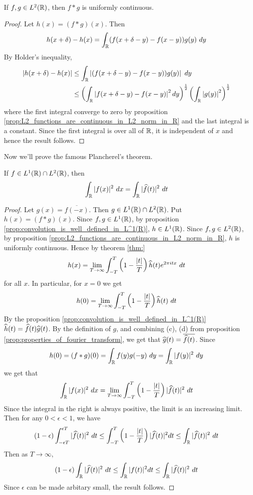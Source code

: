   \begin{proposition}
    If $f, g \in L^2(\mathbb R)$, then $f*g$ is uniformly continuous.
  \end{proposition}
  \begin{proof}
    Let $h(x) = (f*g)(x)$. Then $$h(x+\delta) - h(x) = \int_\mathbb R (f(x+\delta - y) - f(x-y)) g(y) \ dy$$
    By Holder's inequality, 
    \begin{align*}
      |h(x+\delta) - h(x)| &\le \int_\mathbb R \left|(f(x+\delta - y) - f(x-y)) g(y) \right| \ dy \\
      &\le \left( \int_\mathbb R \left|f(x+\delta - y) - f(x-y) \right|^2 dy\right)^{\frac{1}{2}} \left( \int_\mathbb R \left|g(y)\right|^2 \right)^{\frac{1}{2}}
    \end{align*}
    where the first integral converge to zero by proposition \ref{prop:L2_functions_are_continuous_in_L2_norm_in_R} and the last integral is a constant. Since the first integral is over all of $\mathbb R$, it is independent of $x$ and hence the result follows.
  \end{proof}

Now we'll prove the famous Plancherel's theorem.
\begin{theorem}
  \label{thm:Plancherel's_theorem}
  If $f \in L^1(\mathbb R) \cap L^2(\mathbb R)$, then $$\int_\R |f(x)|^2 \ dx = \int_\R |\hatf(t)|^2 \ dt $$
\end{theorem}
\begin{proof}
  Let $g(x) = \overline{f(-x)}$. Then $g \in L^1(\mathbb R)\cap L^2(\mathbb R)$. Put $h(x) = (f*g)(x)$. Since $f, g \in L^1(\mathbb R)$, by proposition \ref{prop:convolution_is_well_defined_in_L^1(R)}, $h \in L^1(\mathbb R)$. Since $f, g \in L^2(\mathbb R)$, by proposition \ref{prop:L2_functions_are_continuous_in_L2_norm_in_R}, $h$ is uniformly continuous. 
  Hence by theorem \ref{thm:}  $$h(x) = \lim_{T\to \infty} \int_{-T}^T \left(1-\frac{|t|}{T}\right) \widehat{h}(t)e^{2\pi itx} \ dt $$ for all $x$. In particular, for $x=0$ we get $$h(0) = \lim_{T\to \infty} \int_{-T}^T \left(1-\frac{|t|}{T}\right) \widehat{h}(t) \ dt$$
  By the proposition \ref{prop:convolution_is_well_defined_in_L^1(R)} $\widehat{h}(t) = \widehat{f}(t)\widehat{g}(t)$. By the definition of $g$, and combining (c), (d) from proposition \ref{prop:properties_of_fourier_transform}, we get that $\widehat{g}(t) = \overline{\widehat{f}(t)}$.
  Since $$h(0) = (f*g)(0) = \int_\mathbb R f(y)g(-y) \ dy = \int_\mathbb R |f(y)|^2 \ dy$$
  we get that $$\int_\R |f(x)|^2 \ dx = \lim_{T\to \infty} \int_{-T}^T \left(1-\frac{|t|}{T}\right) |\hatf(t)|^2 \ dt$$
  Since the integral in the right is always positive, the limit is an increasing limit. Then for any $0<\epsilon<1$, we have $$(1-\epsilon) \int_{-\epsilon T}^{\epsilon T} |\hatf(t)|^2 \ dt \le \int_{-T}^{T} \left( 1-\frac{|t|}{T} \right) |\hatf(t)|^2 dt \le \int_\R |\hatf(t)|^2 \ dt$$
  Then as $T \to \infty$, $$(1-\epsilon) \int_\mathbb R |\widehat{f}(t)|^2 \ dt \le \int_{\mathbb R} |f(t)|^2 dt \le \int_\mathbb R |\widehat{f}(t)|^2 \ dt$$
  Since $\epsilon$ can be made arbitary small, the result follows.


\end{proof}
